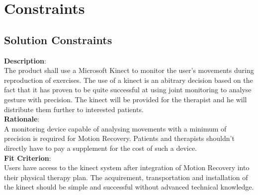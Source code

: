 \section{Constraints}
\subsection{Solution Constraints}
\begin{tcolorbox}[minimalcard]
    \raggedright\textbf{Description}: \vspace{6pt}\\
    The product shall use a Microsoft Kinect to monitor the user's movements during reproduction of exercises. The use of a kinect is an abitrary decision based on the fact that it has proven to be quite successful at using joint monitoring to analyse gesture with precision. The kinect will be provided for the therapist and he will distribute them further to interested patients.\\
    \vspace{6pt}
    \textbf{Rationale}: \vspace{6pt}\\
    A monitoring device capable of analysing movements with a minimum of precision is required for Motion Recovery. Patients and therapists shouldn't directly have to pay a supplement for the cost of such a device.\\
    \vspace{6pt}
    \textbf{Fit Criterion}: \vspace{6pt}\\
    Users have access to the kinect system after integration of Motion Recovery into their physical therapy plan. The acquirement, transportation and installation of the kinect should be simple and successful without advanced technical knowledge.  
\end{tcolorbox}
